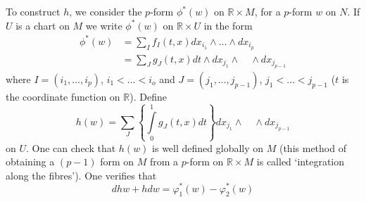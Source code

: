 To construct $h$, we consider the $p$-form $\phi^{*}(w)$ on $\mathbb{R}\times M$, for a $p$-form $w$ on $N$. If $U$ is a chart on $M$ we write $\phi^{*}(w)$ on $\mathbb{R}\times U$ in the form 
\begin{align*}
\phi^{*}(w) &= \sum\limits_{I}f_{I}(t,x)dx_{i_{1}}\wedge\ldots\wedge dx_{i_{p}}\\[3pt]
           &= \sum\limits_{J}g_{J}(t,x)dt\wedge dx_{j_{1}}\wedge\quad\wedge dx_{j_{p-1}}
\end{align*}
where $I=(i_{1},\ldots,i_{p})$, $i_{1}<\ldots<i_{o}$ and $J=(j_{1},\ldots,j_{p-1})$, $j_{1}<\ldots < j_{p-1}$ ($t$ is the coordinate function on $\mathbb{R}$). Define
$$
h(w)=\sum\limits_{J}\left\{\int\limits^{1}_{0}g_{J}(t,x)dt\right\}dx_{j_{1}}\wedge\quad\wedge dx_{j_{p-1}}
$$
on $U$. One can check that $h(w)$ is well defined globally on $M$ (this method of obtaining a $(p-1)$ form on $M$ from a $p$-form on $\mathbb{R}\times M$ is called `integration along the fibres'). One verifies that
$$
dhw+hdw=\varphi^{*}_{1}(w)-\varphi^{*}_{2}(w)
$$












